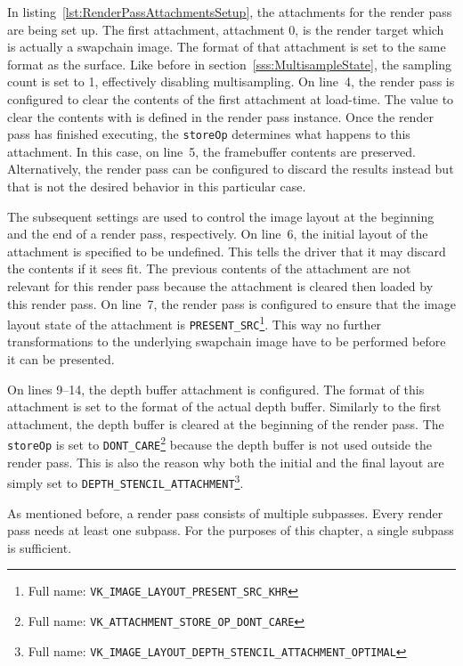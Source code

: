         In listing~\ref{lst:RenderPassAttachmentsSetup}, the attachments for the render pass are being set up.
        The first attachment, attachment 0, is the render target which is actually a swapchain image.
        The format of that attachment is set to the same format as the surface.
        Like before in section~\ref{sss:MultisampleState}, the sampling count is set to 1, effectively disabling multisampling.
        On line~4, the render pass is configured to clear the contents of the first attachment at load-time.
        The value to clear the contents with is defined in the render pass instance.
        Once the render pass has finished executing, the \lstinline{storeOp} determines what happens to this attachment.
        In this case, on line~5, the framebuffer contents are preserved.
        Alternatively, the render pass can be configured to discard the results instead but that is not the desired behavior in this particular case.

        The subsequent settings are used to control the image layout at the beginning and the end of a render pass, respectively.
        On line~6, the initial layout of the attachment is specified to be undefined.
        This tells the \gls{driver} that it may discard the contents if it sees fit.
        The previous contents of the attachment are not relevant for this render pass because the attachment is cleared then loaded by this render pass.
        On line~7, the render pass is configured to ensure that the image layout state of the attachment is \lstinline{PRESENT_SRC}\footnote{Full name: \lstinline{VK_IMAGE_LAYOUT_PRESENT_SRC_KHR}}.
        This way no further transformations to the underlying swapchain image have to be performed before it can be presented.

        On lines 9--14, the depth buffer attachment is configured.
        The format of this attachment is set to the format of the actual depth buffer.
        Similarly to the first attachment, the depth buffer is cleared at the beginning of the render pass.
        The \lstinline{storeOp} is set to \lstinline{DONT_CARE}\footnote{Full name: \lstinline{VK_ATTACHMENT_STORE_OP_DONT_CARE}} because the depth buffer is not used outside the render pass.
        This is also the reason why both the initial and the final layout are simply set to \lstinline{DEPTH_STENCIL_ATTACHMENT}\footnote{Full name: \lstinline{VK_IMAGE_LAYOUT_DEPTH_STENCIL_ATTACHMENT_OPTIMAL}}.

        As mentioned before, a render pass consists of multiple subpasses.
        Every render pass needs at least one subpass.
        For the purposes of this chapter, a single subpass is sufficient.

